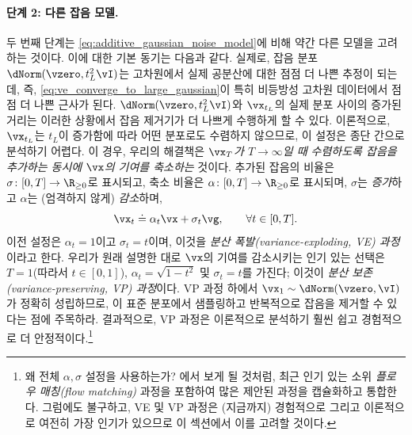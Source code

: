 \documentclass[../../book-main_ko.tex]{subfiles}
\begin{document}
\paragraph{단계 2: 다른 잡음 모델.} 두 번째 단계는 \eqref{eq:additive_gaussian_noise_model}에 비해 약간 다른 모델을 고려하는 것이다. 이에 대한 기본 동기는 다음과 같다. 실제로, 잡음 분포 \(\dNorm(\vzero, t_{L}^{2}\vI)\)는 고차원에서 실제 공분산에 대한 점점 더 나쁜 추정이 되는데, 즉, \eqref{eq:ve_converge_to_large_gaussian}이 특히 비등방성 고차원 데이터에서 점점 더 나쁜 근사가 된다. \(\dNorm(\vzero, t_{L}^{2}\vI)\)와 \(\vx_{t_{L}}\)의 실제 분포 사이의 증가된 거리는 이러한 상황에서 잡음 제거기가 더 나쁘게 수행하게 할 수 있다. 이론적으로, \(\vx_{t_{L}}\)는 \(t_{L}\)이 증가함에 따라 어떤 분포로도 수렴하지 않으므로, 이 설정은 종단 간으로 분석하기 어렵다. 이 경우, 우리의 해결책은 \textit{\(\vx_{T}\)가 \(T \to \infty\)일 때 수렴하도록 잡음을 추가하는 동시에 \(\vx\)의 기여를 축소하는} 것이다. 추가된 잡음의 비율은 \(\sigma \colon [0, T] \to \R_{\geq 0}\)로 표시되고, 축소 비율은 \(\alpha \colon [0, T] \to \R_{\geq 0}\)로 표시되며, \(\sigma\)는 \textit{증가}하고 \(\alpha\)는 (엄격하지 않게) \textit{감소}하며,
\begin{equation}\label{eq:gen_additive_gaussian_noise_model}
	\vx_{t} \doteq \alpha_{t}\vx + \sigma_{t}\vg, \qquad \forall t \in [0, T].
\end{equation}
이전 설정은 \(\alpha_{t} = 1\)이고 \(\sigma_{t} = t\)이며, 이것을 \textit{분산 폭발(variance-exploding, VE) 과정}이라고 한다. 우리가 원래 설명한 대로 \(\vx\)의 기여를 감소시키는 인기 있는 선택은 \(T = 1\)(따라서 \(t \in [0, 1]\)), \(\alpha_{t} = \sqrt{1 - t^{2}}\) 및 \(\sigma_{t} = t\)를 가진다; 이것이 \textit{분산 보존(variance-preserving, VP) 과정}이다. VP 과정 하에서 \(\vx_{1} \sim \dNorm(\vzero, \vI)\)가 정확히 성립하므로, 이 표준 분포에서 샘플링하고 반복적으로 잡음을 제거할 수 있다는 점에 주목하라. 결과적으로, VP 과정은 이론적으로 분석하기 훨씬 쉽고 경험적으로 더 안정적이다.\footnote{왜 전체 \(\alpha, \sigma\) 설정을 사용하는가? 에서 보게 될 것처럼, 최근 인기 있는 소위 \textit{플로우 매칭(flow matching)} 과정을 포함하여 많은 제안된 과정을 캡슐화하고 통합한다. 그럼에도 불구하고, VE 및 VP 과정은 (지금까지) 경험적으로 그리고 이론적으로 여전히 가장 인기가 있으므로 이 섹션에서 이를 고려할 것이다.}
\end{document}
